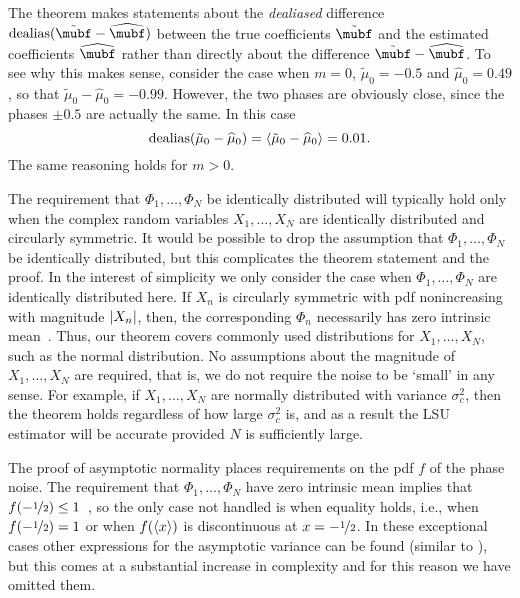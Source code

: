 \documentclass[journal]{IEEEtran}
\begin{document}
The theorem makes statements about the \emph{dealiased} difference $\dealias(\tilde{\mubf} - \widehat{\mubf})$ between the true coefficients $\tilde{\mubf}$ and the estimated coefficients $\widehat{\mubf}$ rather than directly about the difference $\tilde{\mubf} - \widehat{\mubf}$.   To see why this makes sense, consider the case when $m=0$, $\tilde{\mu}_0 = -0.5$ and $\widehat{\mu}_0 = 0.49$, so that $\tilde{\mu}_0 - \widehat{\mu}_0 = -0.99$.  However, the two phases are obviously close, since the phases $\pm 0.5$ are actually the same.  In this case 
\[
\operatorname{dealias}(\tilde{\mu}_0 - \widehat{\mu}_0) = \left\langle \tilde{\mu}_0 - \widehat{\mu}_0 \right\rangle = 0.01.
\] 
The same reasoning holds for $m > 0$.

The requirement that $\Phi_1, \dots, \Phi_N$ be identically distributed will typically hold only when the complex random variables $X_1, \dots, X_N$ are identically distributed and circularly symmetric.  It would be possible to drop the assumption that $\Phi_1, \dots, \Phi_N$ be identically distributed, but this complicates the theorem statement and the proof.  In the interest of simplicity we only consider the case when $\Phi_1, \dots, \Phi_N$ are identically distributed here.  If $X_n$ is circularly symmetric with pdf nonincreasing with magnitude $\left\vert X_n \right\vert$, then, the corresponding $\Phi_n$ necessarily has zero intrinsic mean~\cite[Theorem 5.2]{McKilliam2010thesis}.  Thus, our theorem covers commonly used distributions for $X_1, \dots, X_N$, such as the normal distribution.  No assumptions about the magnitude of $X_1, \dots, X_N$ are required, that is, we do not require the noise to be `small' in any sense.  For example, if $X_1, \dots, X_N$ are normally distributed with variance $\sigma_c^2$, then the theorem holds regardless of how large $\sigma_c^2$ is, and as a result the LSU estimator will be accurate provided $N$ is sufficiently large.

The proof of asymptotic normality places requirements on the pdf $f$ of the phase noise.  The requirement that $\Phi_1, \dots, \Phi_N$ have zero intrinsic mean implies that $f(-\nicefrac{1}{2}) \leq 1$~\cite[Lemma~1]{McKilliam_mean_dir_est_sq_arc_length2010}, so the only case not handled is when equality holds, i.e., when $f(-\nicefrac{1}{2}) = 1$ or when $f(\left\langle x \right\rangle)$ is discontinuous at $x = -\nicefrac{1}{2}$. In these exceptional cases other expressions for the asymptotic variance can be found (similar to \cite[Theorem 3.1]{Hotz_circle_means_2011}), but this comes at a substantial increase in complexity and for this reason we have omitted them. %
\end{document}
